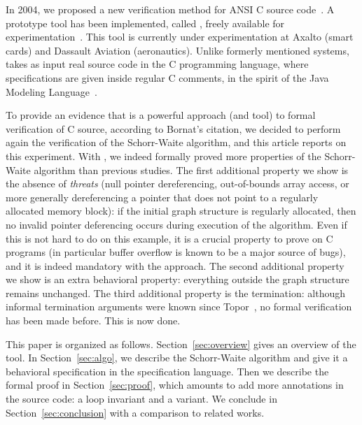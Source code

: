 In 2004, we proposed a new verification method for ANSI
C source code~\cite{filliatre04icfem}.  A prototype tool has been
implemented, called \caduceus{}, freely available for
experimentation~\cite{Caduceus}. This tool is currently under
experimentation at Axalto (smart cards) and Dassault Aviation
(aeronautics). Unlike formerly mentioned systems, \caduceus{} takes as
input real source code in the C programming language, where
specifications are given inside regular C comments, in the spirit of
the Java Modeling Language~\cite{leavens00jml}. 

To provide an evidence that \caduceus{} is a powerful approach (and
tool) to formal verification of C source, according to Bornat's
citation, we decided to perform again the verification of the
Schorr-Waite algorithm, and this article reports on this experiment.
With \caduceus{}, we indeed formally proved more properties of the
Schorr-Waite algorithm than previous studies.  The first additional
property we show is the absence of \emph{threats} (null pointer
dereferencing, out-of-bounds array access, or more generally dereferencing
a pointer that does not point to a regularly allocated memory block):
if the initial graph structure is regularly allocated, then no invalid pointer deferencing occurs during execution
of the algorithm. Even if this is not hard to do on this example, it
is a crucial property to prove on C programs (in particular buffer
overflow is known to be a major source of bugs), and it is indeed
mandatory with the \caduceus{} approach. The second additional
property we show is an extra behavioral property: everything outside
the graph structure remains unchanged. The third additional property is
the termination: although informal termination arguments were known
since Topor~\cite{topor79acta}, %
no formal verification has been made before. This is now done.

This paper is organized as follows.  Section~\ref{sec:overview} gives
an overview of the \caduceus{} tool.  In Section~\ref{sec:algo}, we
describe the Schorr-Waite algorithm and give it a behavioral
specification in the \caduceus{} specification language.  Then we
describe the formal proof in Section~\ref{sec:proof}, which
amounts to add more annotations in the source code: a loop invariant
and a variant. We conclude in Section~\ref{sec:conclusion} with a
comparison to related works.





